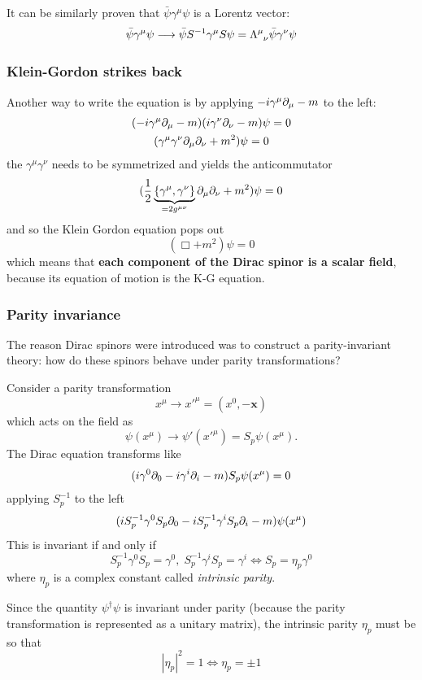 It can be similarly proven that $\bar\psi\gamma^\mu\psi$ is a Lorentz vector:
$$\bar\psi\gamma^\mu\psi\longrightarrow\bar\psi S^{-1}\gamma^\mu S\psi=
\Lambda\indices{^\mu_\nu}\bar\psi\gamma^\nu\psi$$

\subsubsection{Klein-Gordon strikes back}
Another way to write the equation is by applying $-i\gamma^\mu\partial_\mu-m$ to the
left:
\begin{gather*}
(-i\gamma^\mu\partial_\mu-m)(i\gamma^\nu\partial_\nu -m)\psi=0\\
(\gamma^\mu\gamma^\nu\partial_\mu\partial_\nu+m^2)\psi=0\\
\end{gather*}
the $\gamma^\mu\gamma^\nu$ needs to be symmetrized and yields the anticommutator
$$(\frac{1}{2}\underbrace{\{\gamma^\mu,\gamma^\nu\}}_{=2g^{\mu\nu}}\partial_\mu\partial_\nu
+m^2)\psi = 0$$
and so the Klein Gordon equation pops out
$$\left(\Box + m^2\right)\psi=0$$
which means that \textbf{each component of the Dirac spinor is a scalar field},
because its equation of motion is the K-G equation.
\subsubsection{Parity invariance}
The reason Dirac spinors were introduced was to construct a parity-invariant
theory: how do these spinors behave under parity transformations?

Consider a parity transformation
$$x^\mu\to x'^\mu = (x^0,-\mathbf{x})$$
which acts on the field as
$$\psi(x^\mu)\to\psi'(x'^\mu) = S_p\psi(x^\mu).$$
The Dirac equation transforms like
$$(i\gamma^0\partial_0-i\gamma^i\partial_i-m)S_p\psi(x^\mu)=0$$
applying $S^{-1}_p$ to the left
$$(i S^{-1}_p\gamma^0S_p\partial_0-iS_p^{-1}\gamma^i S_p\partial_i-m)\psi(x^\mu)$$
This is invariant if and only if
$$S^{-1}_p\gamma^0 S_p = \gamma^0,\; S^{-1}_p\gamma^i S_p = \gamma^i
\iff S_p = \eta_p\gamma^0$$
where $\eta_p$ is a complex constant called \textit{intrinsic parity}.

Since the quantity $\psi^\dagger\psi$ is invariant under parity (because the
parity transformation is represented as a unitary matrix), the intrinsic
parity $\eta_p$ must be so that
$$|\eta_p|^2=1 \iff\eta_p=\pm1$$
